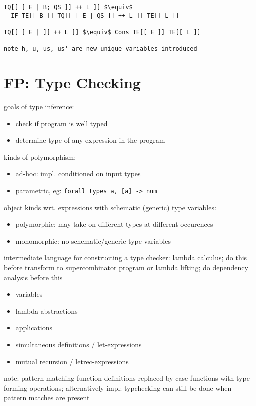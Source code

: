 \documentclass[8pt]{extarticle}
\begin{document}
\begin{multicols*}{2}
\begin{lstlisting}
TQ[[ [ E | B; QS ]] ++ L ]] $\equiv$
  IF TE[[ B ]] TQ[[ [ E | QS ]] ++ L ]] TE[[ L ]]

TQ[[ [ E | ]] ++ L ]] $\equiv$ Cons TE[[ E ]] TE[[ L ]]

note h, u, us, us' are new unique variables introduced
\end{lstlisting}

\vfill\null
\columnbreak

\section{FP: Type Checking}

goals of type inference:
\begin{itemize}
\item check if program is well typed
\item determine type of any expression in the program
\end{itemize}

kinds of polymorphism:
\begin{itemize}
\item ad-hoc: impl. conditioned on input types
\item parametric, eg: \verb|forall types a, [a] -> num|
\end{itemize}

object kinds wrt. expressions with schematic (generic) type variables:
\begin{itemize}
\item polymorphic: may take on different types at different occurences
\item monomorphic: no schematic/generic type variables
\end{itemize}

intermediate language for constructing a type checker: lambda calculus; do this before transform to supercombinator program or lambda lifting; do dependency analysis before this
\begin{itemize}
\item variables
\item lambda abstractions
\item applications
\item simultaneous definitions / let-expressions
\item mutual recursion / letrec-expressions
\end{itemize}

note: pattern matching function definitions replaced by case functions with type-forming operations; alternatively impl: typchecking can still be done when pattern matches are present


\end{multicols*}
\end{document}

